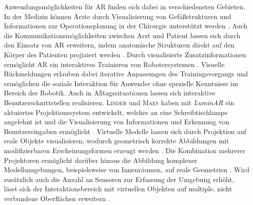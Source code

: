 Anwendungsmöglichkeiten für AR finden sich dabei in verschiedensten Gebieten. In der Medizin können Ärzte durch Visualisierung von Gefäßstrukturen und Informationen zur Operationsplanung in der Chirurgie unterstützt werden \cite{Nicolau2011}. Auch die Kommunikationsmöglichkeiten zwischen Arzt und Patient lassen sich durch den Einsatz von AR erweitern, indem anatomische Strukturen direkt auf den Körper des Patienten projiziert werden \cite{Bluteau2005}. Durch visualisierte Zusatzinformationen ermöglicht AR ein interaktives Trainieren von Robotersystemen \cite{DeTommaso2012}. Visuelle Rückmeldungen erlauben dabei iterative Anpassungen des Trainingsvorgangs und ermöglichen die soziale Interaktion für Anwender ohne spezielle Kenntnisse im Bereich der Robotik. Auch in Alltagssituationen lassen sich interaktive Benutzerschnittstellen realisieren. \textsc{Linder} und \textsc{Maes} haben mit \textit{LuminAR} ein aktuiertes Projektionssystem entwickelt, welches an eine Schreibtischlampe angelehnt ist und die Visualisierung von Informationen und Erkennung von Benutzereingaben ermöglicht \cite{Linder2010}. Virtuelle Modelle lassen sich durch Projektion auf reale Objekte visualisieren, wodurch geometrisch korrekte Abbildungen mit modifizierbaren Erscheinungsformen erzeugt werden \cite{Raskar1999}. Die Kombination mehrerer Projektoren ermöglicht darüber hinaus die Abbildung komplexer Modellumgebungen, beispielsweise von Innenräumen, auf reale Geometrien \cite{Low2001}. Wird zusätzlich auch die Anzahl an Sensoren zur Erfassung der Umgebung erhöht, lässt sich der Interaktionsbereich mit virtuellen Objekten auf multiple, nicht verbundene Oberflächen erweitern \cite{Wilson2010}.\\



